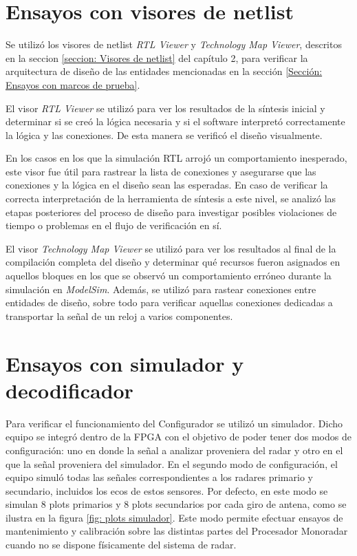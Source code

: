     
    
   
    



\section{Ensayos con visores de netlist}

Se utilizó los visores de netlist \textit{RTL Viewer} y \textit{Technology Map Viewer}, descritos en la seccion \ref{seccion: Visores de netlist} del capítulo 2, para verificar la arquitectura de diseño de las entidades mencionadas en la sección \ref{Sección: Ensayos con marcos de prueba}.

El visor \textit{RTL Viewer} se utilizó para ver los resultados de la síntesis inicial y determinar si se creó la lógica necesaria y si el software interpretó correctamente la lógica y las conexiones. De esta manera se verificó el diseño visualmente.

En los casos en los que la simulación RTL arrojó un comportamiento inesperado, este visor fue útil para rastrear la lista de conexiones y asegurarse que las conexiones y la lógica en el diseño sean las esperadas. En caso de verificar la correcta interpretación de la herramienta de síntesis a este nivel, se analizó las etapas posteriores del proceso de diseño para investigar posibles violaciones de tiempo o problemas en el flujo de verificación en sí.

El visor \textit{Technology Map Viewer} se utilizó para ver los resultados al final de la compilación completa del diseño y determinar qué recursos fueron asignados en aquellos bloques en los que se observó un comportamiento erróneo durante la simulación en \textit{ModelSim}. Además, se utilizó para rastear conexiones entre entidades de diseño, sobre todo para verificar aquellas conexiones dedicadas a transportar la señal de un reloj a varios componentes.




\section{Ensayos con simulador y decodificador}
\label{Ensayos_simulador_decodificador}
Para verificar el funcionamiento del Configurador se utilizó un simulador. Dicho equipo se integró dentro de la FPGA con el objetivo de poder tener dos modos de configuración: uno en donde la señal a analizar proveniera del radar y otro en el que la señal proveniera del simulador. En el segundo modo de configuración, el equipo simuló todas las señales correspondientes a los radares primario y secundario, incluidos los ecos de estos sensores. Por defecto, en este modo se simulan 8 plots primarios y 8 plots secundarios por cada giro de antena, como se ilustra en la figura \ref{fig: plots simulador}. Este modo permite efectuar ensayos de mantenimiento y calibración sobre las distintas partes del Procesador Monoradar cuando no se dispone físicamente del sistema de radar.

